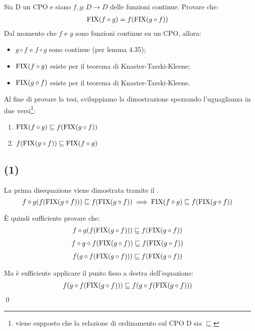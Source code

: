\newcommand{\lt}{\sqsubseteq}

{Sia D un CPO e siano $f,g: D \to{} D$ delle funzioni continue. Provare che:
\begin{align*}
\textrm{\normalfont{FIX}}(f \circ g) = f(\textrm{\normalfont{FIX}}(g \circ f))
\end{align*}
}
{}
Dal momento che $f$ e $g$ sono funzioni continue su un CPO, allora:

\begin{itemize}
  \item $g \circ f$ e $f \circ g$ sono continue (per lemma 4.35);
  \item $\textrm{\normalfont{FIX}}(f \circ g)$ esiste per il teorema di Knaster-Tarski-Kleene;
  \item $\textrm{\normalfont{FIX}}(g \circ f)$ esiste per il teorema di Knaster-Tarski-Kleene.
\end{itemize}

Al fine di provare la tesi, sviluppiamo la dimostrazione spezzando l'uguaglianza
in due versi\footnote{viene supposto che la relazione di ordinamento sul CPO D
sia $\lt$}:

\begin{enumerate}[label=(\arabic*)]
  \item $\fixp{f \circ g} \lt f(\fixp{g \circ f})$
  \item $f(\fixp{g \circ f}) \lt \fixp{f \circ g}$
\end{enumerate}

\subsection{(1)}
La prima disequazione viene dimostrata tramite il \FPIL.
$$
f \circ g(f(\fixp{g \circ f})) \lt f(\fixp{g \circ f})
\implies
\fixp{f \circ g} \lt f(\fixp{g \circ f})
$$

È quindi sufficiente provare che:
\begin{align*}
f \circ g(f(\fixp{g \circ f})) \lt f(\fixp{g \circ f})
\end{align*}
\begin{align*}
f \circ g \circ f(\fixp{g \circ f}) \lt f(\fixp{g \circ f})
\end{align*}
\begin{align*}
f (g \circ f(\fixp{g \circ f})) \lt f(\fixp{g \circ f})
\end{align*}

Ma è sufficiente applicare il punto fisso a destra dell'equazione:
\begin{align*}
f (g \circ f(\fixp{g \circ f})) \lt f (g \circ f(\fixp{g \circ f}))
\end{align*} \qed

